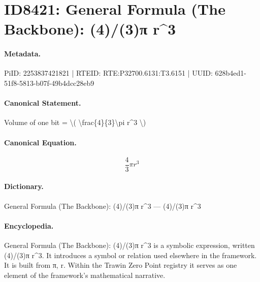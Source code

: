 \section*{ID8421: General Formula (The Backbone): (4)/(3)π r\textasciicircum{}3}
\paragraph{Metadata.}
PiID: 2253837421821 | RTEID: RTE:P32700.6131:T3.6151 | UUID: 628b4ed1-51f8-5813-b07f-49b4dcc28eb9

\paragraph{Canonical Statement.}
Volume of one bit = \textbackslash{}( \textbackslash{}frac\{4\}\{3\}\textbackslash{}pi r\textasciicircum{}3 \textbackslash{})

\paragraph{Canonical Equation.}
\[
\frac{4}{3}\pi r^3
\]

\paragraph{Dictionary.}
General Formula (The Backbone): (4)/(3)π r\textasciicircum{}3 — (4)/(3)π r\textasciicircum{}3

\paragraph{Encyclopedia.}
General Formula (The Backbone): (4)/(3)π r\textasciicircum{}3 is a symbolic expression, written (4)/(3)π r\textasciicircum{}3. It introduces a symbol or relation used elsewhere in the framework. It is built from π, r. Within the Trawin Zero Point registry it serves as one element of the framework's mathematical narrative.
